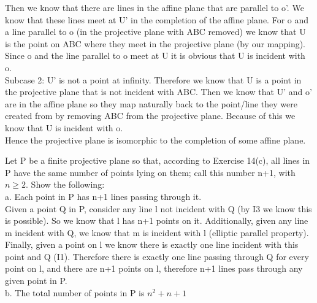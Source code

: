 \documentclass[12pt,letterpaper]{article}
\newcommand{\prob}[1]{\newpage\noindent {\bf #1}}
\begin{document}
Then we know that there are lines in the affine plane that are parallel to o'.  We know that these lines meet at U' in the completion of the affine plane. For o and a line parallel to o (in the projective plane with ABC removed) we know that U is the point on ABC where they meet in the projective plane (by our mapping).  Since o and the line parallel to o meet at U it is obvious that U is incident with o.\\

Subcase 2: U' is not a point at infinity.  Therefore we know that U is a point in the projective plane that is not incident with ABC.  Then we know that U' and o' are in the affine plane so they map naturally back to the point/line they were created from by removing ABC from the projective plane.  Because of this we know that U is incident with o.\\


Hence the projective plane is isomorphic to the completion of some affine plane.  










\prob{Major exercise 3} Let P be a finite projective plane so that, according to Exercise 14(c), all lines in P have the same number of points lying on them;  call this number n+1, with $n \geq 2$.  Show the following:\\

a. Each point in P has n+1 lines passing through it.  \\

Given a point Q in P, consider any line l not incident with Q (by I3 we know this is possible).  So we know that l has n+1 points on it.  Additionally, given any line m incident with Q, we know that m is incident with l (elliptic parallel property).  Finally, given a point on l we know there is exactly one line incident with this point and Q (I1).  Therefore there is exactly one line passing through Q for every point on l, and there are n+1 points on l, therefore n+1 lines pass through any given point in P.\\



b. The total number of points in P is $n^2 + n + 1$\\
\end{document}

